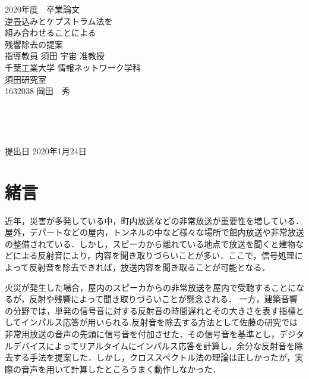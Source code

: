 \documentclass[a4j,11pt]{jsarticle}
\begin{document}
\setcounter{tocdepth}{3}
\thispagestyle{empty}
\clearpage
\addtocounter{page}{-1}
\begin{center}

\huge
2020年度　卒業論文\\[60pt]
\HUGE
逆畳込みとケプストラム法を\\
組み合わせることによる\\
残響除去の提案\\[65pt]
\huge
指導教員 須田 宇宙 准教授\\[40pt]
千葉工業大学 情報ネットワーク学科\\[10pt]
須田研究室\\[40pt]
1632038 \hspace{70pt} 岡田　秀\\[110pt]
\end{center}
\begin{flushright} 
\huge

\textcolor{white}{文字}

\textcolor{white}{文字}

提出日 2020年1月24日
\end{flushright}
\newpage
\thispagestyle{empty}
\clearpage
\addtocounter{page}{-1}
\large
\tableofcontents
\thispagestyle{empty}
\clearpage
\addtocounter{page}{-1}
\newpage
\listoftables
\listoffigures
\thispagestyle{empty}
\clearpage
\addtocounter{page}{-1}

\newpage

\section{緒言}

近年，災害が多発している中，町内放送などの非常放送が重要性を増している\cite{oka1}．屋外，デパートなどの屋内，トンネルの中など様々な場所で館内放送や非常放送の整備されている．しかし，スピーカから離れている地点で放送を聞くと建物などによる反射音により，内容を聞き取りづらいことが多い．ここで，信号処理によって反射音を除去できれば，放送内容を聞き取ることが可能となる．

火災が発生した場合，屋内のスピーカからの非常放送を屋内で受聴することになるが，反射や残響によって聞き取りづらいことが懸念される．
一方，建築音響の分野では，単発の信号音に対する反射音の時間遅れとその大きさを表す指標としてインパルス応答が用いられる.反射音を除去する方法として佐藤\cite{oka2}の研究では非常用放送の音声の先頭に信号音を付加させた．その信号音を基準とし，デジタルデバイスによってリアルタイムにインパルス応答を計算し，余分な反射音を除去する手法を提案した．しかし，クロススペクトル法の理論は正しかったが，実際の音声を用いて計算したところうまく動作しなかった．
\end{document}

